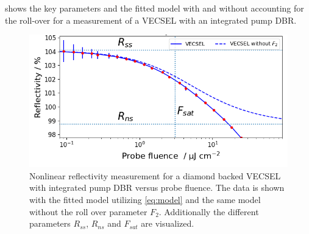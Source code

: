  shows the key parameters and the fitted model with and without accounting for the roll-over for a measurement of a VECSEL with an integrated pump DBR.


\begin{figure}[ht]
    \centering
    \includegraphics[width=12cm]{images/gainSat.png}
    \caption{Nonlinear reflectivity measurement for a diamond backed VECSEL with integrated pump DBR versus probe fluence. The data is shown with the fitted model utilizing \cref{eq:model} and the same model without the roll over parameter $F_2$. Additionally the different parameters $R_{ss}$, $R_{ns}$ and $F_{sat}$ are visualized.}
    \label{fig:gainSat}
\end{figure}